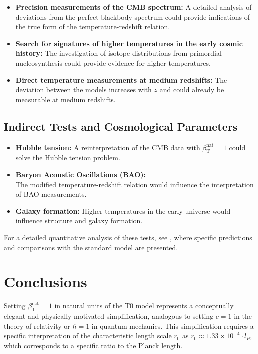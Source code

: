 ﻿\documentclass[12pt,a4paper]{article}
\newcommand{\betaT}{\beta_{\text{T}}}
\begin{document}
	\begin{itemize}
		\item \textbf{Precision measurements of the CMB spectrum:} A detailed analysis of deviations from the perfect blackbody spectrum could provide indications of the true form of the temperature-redshift relation.
		\item \textbf{Search for signatures of higher temperatures in the early cosmic history:} The investigation of isotope distributions from primordial nucleosynthesis could provide evidence for higher temperatures.
		\item \textbf{Direct temperature measurements at medium redshifts:} The deviation between the models increases with \(z\) and could already be measurable at medium redshifts.
	\end{itemize}
	
	\subsection{Indirect Tests and Cosmological Parameters}
	
	\begin{itemize}
		\item \textbf{Hubble tension:} A reinterpretation of the CMB data with \(\betaT^{\text{nat}} = 1\) could solve the Hubble tension problem.
		\item \textbf{Baryon Acoustic Oscillations (BAO):} \\The modified temperature-redshift relation would influence the interpretation of BAO measurements.
		\item \textbf{Galaxy formation:} Higher temperatures in the early universe would influence structure and galaxy formation.
	\end{itemize}
	
	For a detailed quantitative analysis of these tests, see \cite{pascher_alphabeta_2025}, where specific predictions and comparisons with the standard model are presented.
	
	\section{Conclusions}
	
	Setting \(\betaT^{\text{nat}} = 1\) in natural units of the T0 model represents a conceptually elegant and physically motivated simplification, analogous to setting \(c = 1\) in the theory of relativity or \(\hbar = 1\) in quantum mechanics. This simplification requires a specific interpretation of the characteristic length scale \(r_0\) as \(r_0 \approx 1.33 \times 10^{-4} \cdot l_P\), which corresponds to a specific ratio to the Planck length.
	
\end{document}
